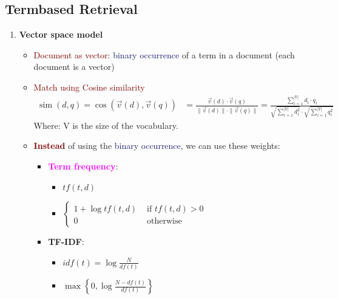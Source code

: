 \subsection{Termbased Retrieval}
\begin{enumerate}
    \item \textbf{Vector space model}
    \begin{itemize}
    \setlength\itemsep{0em}
        \item \textcolor{Maroon}{Document as vector}: \textcolor{MidnightBlue}{binary occurrence} of a term in a document (each document is a vector)
        \item \textcolor{Maroon}{Match using Cosine similarity}
        $$ 
        \begin{aligned}
        \operatorname{sim}(d, q)=\cos (\vec{v}(d), \vec{v}(q)) &=\frac{\vec{v}(d) \cdot \vec{v}(q)}{\|\vec{v}(d)\| \cdot\|\vec{v}(q)\|} 
        =\frac{\sum_{i=1}^{|V|} d_{i} \cdot q_{i}}{\sqrt{\sum_{i=1}^{|V|} d_{i}^{2}} \cdot \sqrt{\sum_{i=1}^{|V|} q_{i}^{2}}}
        \end{aligned} 
        $$
        Where: V is the size of the vocabulary.
        \item \textbf{\textcolor{Maroon}{Instead}} of using the \textcolor{MidnightBlue}{binary occurrence}, we can use these weights:
        \begin{itemize}
            \item \textbf{\textcolor{Fuchsia}{Term frequency}}:
            \begin{itemize}
                \item{\makebox[5cm]{\textcolor{Fuchsia}{Raw term frequency}:\hfill} $tf(t, d)$}
                \item{\makebox[5cm]{\textcolor{Fuchsia}{Long term frequency}:\hfill} $\begin{cases}1+\log t f(t, d) & \text { if } t f(t, d)>0 \\ 0 & \text { otherwise }\end{cases}$}
            \end{itemize}
            \item \textbf{\textcolor{RedOrange}{TF-IDF}}:
            \begin{itemize}
                \item{\makebox[6cm]{\textcolor{ForestGreen}{Inverse document frequency (1)}:\hfill} $idf(t) = \log \frac{N}{df(t)}$} 
                \item{\makebox[6cm]{\textcolor{ForestGreen}{Inverse document frequency (2)}:\hfill} $\max \left\{0, \log \frac{N-d f(t)}{d f(t)}\right\}$} \\

\end{itemize}
\end{itemize}
\end{itemize}
\end{enumerate}
